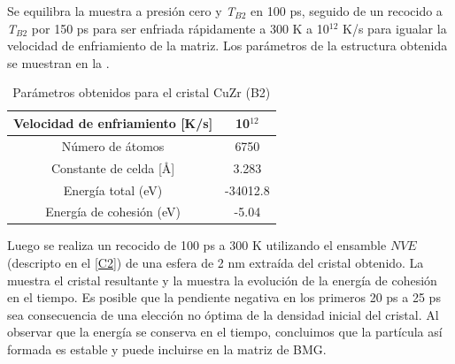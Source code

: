 Se equilibra la muestra a presión cero y \textit{T$_{B2}$} en 100 ps, seguido de un recocido a \textit{T$_{B2}$} por 150 ps para ser enfriada rápidamente a 300 K a 10$^{12}$ K/s para igualar la velocidad de enfriamiento de la matriz. Los parámetros de la estructura obtenida se muestran en la .

\begin{table}[htp]
\begin{center}
\begin{tabular}{*{2}{c}}
\hline
Velocidad de enfriamiento [K/s] & 10$^{12}$ \\
\hline
Número de átomos & 6750 \\
\hline
Constante de celda [\AA] & 3.283 \\
\hline
Energía total (eV) & -34012.8 \\
\hline
Energía de cohesión (eV) & -5.04 \\
\hline
\end{tabular}
\end{center}
\caption{Parámetros obtenidos para el cristal CuZr (B2)}
\label{C4:tb:b2CrystalParameters}
\end{table}

Luego se realiza un recocido de 100 ps a 300 K utilizando el ensamble $NVE$ (descripto en el \cref{C2}) de una esfera de 2 nm extraída del cristal obtenido. La  muestra el cristal resultante y la  muestra la evolución de la energía de cohesión en el tiempo. Es posible que la pendiente negativa en los primeros 20 ps a 25 ps sea consecuencia de una elección no óptima de la densidad inicial del cristal. Al observar que la energía se conserva en el tiempo, concluimos que la partícula así formada es estable y puede incluirse en la matriz de BMG.

